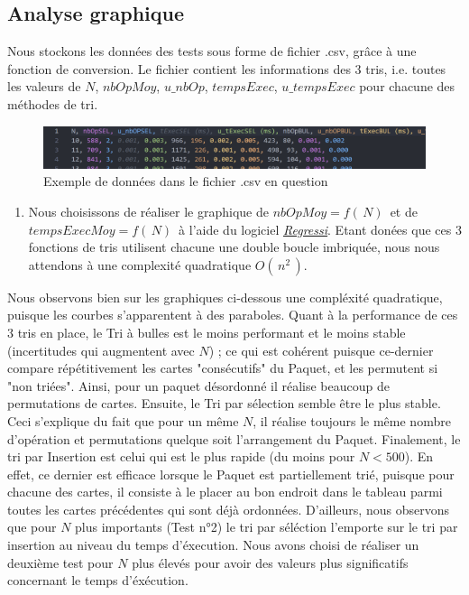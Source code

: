 \documentclass{report}
\begin{document}
\subsection{Analyse graphique}

\qquad Nous stockons les données des tests sous forme de fichier .csv, grâce à une fonction de conversion. Le fichier contient les informations des 3 tris, i.e. toutes les valeurs de $N$, $nbOpMoy$, $u\_nbOp$, $tempsExec$, $u\_tempsExec$ pour chacune des méthodes de tri. 

\begin{figure}[H]
	\includegraphics[width=\textwidth]{../graphe/csvEx.png}
	\caption{Exemple de données dans le fichier .csv en question}
\end{figure}

\begin{enumerate}
	\item[\fcolorbox{black}{black}{\textbf{\textcolor{white}{3}}}] 
	Nous choisissons de réaliser le graphique de $nbOpMoy=f(\,N)\,$ et de $tempsExecMoy=f(\,N)\,$ à l'aide du logiciel \href{https://regressi.fr/WordPress/}{\it \underline{Regressi}}. Etant donées que ces 3 fonctions de tris utilisent chacune une double boucle imbriquée, nous nous attendons à une complexité quadratique $O(\,n^2\,)$.
\end{enumerate}
\qquad Nous observons bien sur les graphiques ci-dessous une compléxité quadratique, puisque les courbes s'apparentent à des paraboles. Quant à la performance de ces 3 tris en place, le Tri à bulles est le moins performant et le moins stable (incertitudes qui augmentent avec $N$) ; ce qui est cohérent puisque ce-dernier compare répétitivement les cartes "consécutifs" du Paquet, et les permutent si "non triées". Ainsi, pour un paquet désordonné il réalise beaucoup de permutations de cartes. Ensuite, le Tri par sélection semble être le plus stable. Ceci s'explique du fait que pour un même $N$, il réalise toujours le même nombre d'opération et permutations quelque soit l'arrangement du Paquet. Finalement, le tri par Insertion est celui qui est le plus rapide (du moins pour $N<500$). En effet, ce dernier est efficace lorsque le Paquet est partiellement trié, puisque pour chacune des cartes, il consiste à le placer au bon endroit dans le tableau parmi toutes les cartes précédentes qui sont déjà ordonnées. D'ailleurs, nous observons que pour $N$ plus importants (Test n°2) le tri par séléction l'emporte sur  le tri par insertion au niveau du temps d'éxecution. Nous avons choisi de réaliser un deuxième test pour $N$ plus élevés pour avoir des valeurs plus significatifs concernant le temps d'éxécution.
\end{document}
